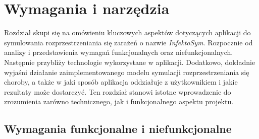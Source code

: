 \chapter{Wymagania i narzędzia}
\label{ch:wymagania-i-narzedzia}
Rozdział skupi się na omówieniu kluczowych aspektów dotyczących aplikacji do symulowania rozprzestrzeniania się zarażeń o nazwie \textit{InfektoSym}. Rozpocznie od analizy i przedstawienia wymagań funkcjonalnych oraz niefunkcjonalnych. Następnie przybliży technologie wykorzystane w aplikacji. Dodatkowo, dokładnie wyjaśni działanie zaimplementowanego modelu symulacji rozprzestrzeniania się choroby, a także w jaki sposób aplikacja oddziałuje z użytkownikiem i jakie rezultaty może dostarczyć. Ten rozdział stanowi istotne wprowadzenie do zrozumienia zarówno technicznego, jak i funkcjonalnego aspektu projektu.

\section{\textbf{Wymagania funkcjonalne i niefunkcjonalne}}
